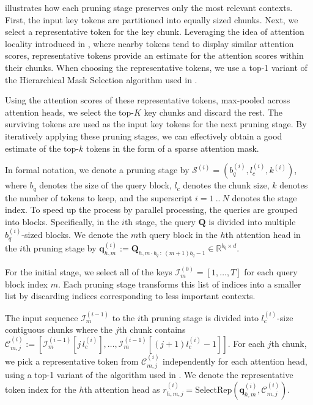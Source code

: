  illustrates how each pruning stage preserves only the most relevant contexts. 
First, the input key tokens are partitioned into equally sized chunks.
Next, we select a representative token for the key chunk. 
Leveraging the idea of attention locality introduced in \citet{lee_training-free_2024}, where nearby tokens tend to display similar attention scores, representative tokens provide an estimate for the attention scores within their chunks. When choosing the representative tokens, we use a top-1 variant of the Hierarchical Mask Selection algorithm used in \citet{lee_training-free_2024}.

Using the attention scores of these representative tokens, max-pooled across attention heads, we select the top-$K$ key chunks and discard the rest. The surviving tokens are used as the input key tokens for the next pruning stage. By iteratively applying these pruning stages, we can effectively obtain a good estimate of the top-$k$ tokens in the form of a sparse attention mask.

In formal notation, we denote a pruning stage by $\mathcal{S}^{(i)} = (b_q^{(i)}, l_{c}^{(i)}, k^{(i)})$, where $b_q$ denotes the size of the query block, $l_{c}$ denotes the chunk size, $k$ denotes the number of tokens to keep, and the superscript $i = 1~..~N$ denotes the stage index.
To speed up the process by parallel processing, the queries are grouped into blocks. Specifically, in the $i$th stage, the query $\bm{Q}$ is divided into multiple $b_q^{(i)}$-sized blocks.
We denote the $m$th query block in the $h$th attention head in the $i$th pruning stage by $\bm{q}_{h,m}^{(i)} := \bm{Q}_{h, m\cdot b_q~:~(m+1)b_q-1} \in \mathbb{R}^{b_q\times d}$.

For the initial stage, we select all of the keys $\mathcal{I}_{m}^{(0)} = [1, \dots, T]$ for each query block index $m$. Each pruning stage transforms this list of indices into a smaller list by discarding indices corresponding to less important contexts.

The input sequence $\mathcal{I}_{m}^{(i-1)}$ to the $i$th pruning stage is divided into $l_{c}^{(i)}$-size contiguous chunks where the $j$th chunk contains $\mathcal{C}^{(i)}_{m,j} := \left[ \mathcal{I}^{(i-1)}_{m}[j\,l_{c}^{(i)}], \dots, \mathcal{I}^{(i-1)}_{m}[(j+1)l_{c}^{(i)}-1] \right]$.
For each $j$th chunk, we pick a representative token from $\mathcal{C}^{(i)}_{m,j}$ independently for each attention head, using a top-1 variant of the algorithm used in \citet{lee_training-free_2024}. We denote the representative token index for the $h$th attention head as $r^{(i)}_{h,m,j} = \text{SelectRep}(\bm{q}_{h,m}^{(i)}, \mathcal{C}^{(i)}_{m,j})$.

